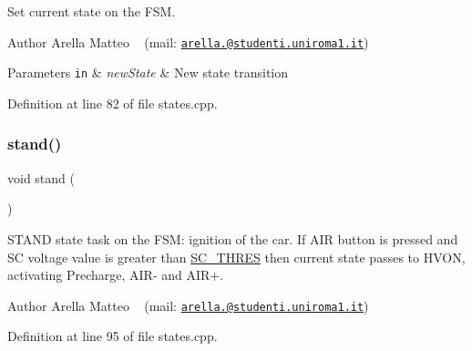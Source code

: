 Set current state on the F\+SM. 

\begin{DoxyAuthor}{Author}
Arella Matteo ~\newline
 (mail\+: \href{mailto:arella.1646983@studenti.uniroma1.it}{\tt arella.@studenti.\+uniroma1.\+it})
\end{DoxyAuthor}

\begin{DoxyParams}[1]{Parameters}
\mbox{\tt in}  & {\em new\+State} & New state transition \\
\hline
\end{DoxyParams}


Definition at line 82 of file states.\+cpp.

\mbox{\label{group__stages__group_ga506140395cba78bffc95d77985780ca5}} 
\subsubsection{\texorpdfstring{stand()}{stand()}}
{\footnotesize\ttfamily void stand (\begin{DoxyParamCaption}{ }\end{DoxyParamCaption})}



S\+T\+A\+ND state task on the F\+SM\+: ignition of the car. If A\+IR button is pressed and SC voltage value is greater than \mbox{\hyperlink{group__stages__group_ga9688af4f17ae88b4d149269d71b7ff1f}{S\+C\+\_\+\+T\+H\+R\+ES}} then current state passes to H\+V\+ON, activating Precharge, A\+I\+R-\/ and A\+I\+R+. 

\begin{DoxyAuthor}{Author}
Arella Matteo ~\newline
 (mail\+: \href{mailto:arella.1646983@studenti.uniroma1.it}{\tt arella.@studenti.\+uniroma1.\+it}) 
\end{DoxyAuthor}


Definition at line 95 of file states.\+cpp.

\mbox{\label{group__stages__group_gac534eb879fa26941a06ffadeb69d92ff}} 
